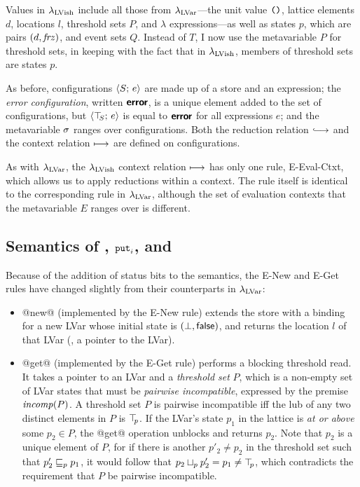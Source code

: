 Values in $\lambda_{\textrm{LVish}}$ include all those from $\lambda_{\textrm{LVar}}$---the
unit value $\mbox{\texttt{()}}$, lattice elements $d$, locations $l$, threshold
sets $P$, and $\lambda$ expressions---as well as states $p$, which are
pairs $(d, \mathit{frz})$, and event sets $Q$.  Instead of $T$, I now
use the metavariable $P$ for threshold sets, in keeping with the fact
that in $\lambda_{\textrm{LVish}}$, members of threshold sets are states $p$.

As before, configurations $\langle S;\, e \rangle$ are made up of a store and
an expression; the \emph{error configuration}, written $\textbf{\textsf{error}}$, is a
unique element added to the set of configurations, but
$\langle \top\hspace{-0.85mm}_{S};\, e \rangle$ is equal to $\textbf{\textsf{error}}$ for all expressions $e$; and
the metavariable $\sigma$ ranges over configurations.  Both the
reduction relation $\parstepsto$ and the context relation
$\longmapsto$ are defined on configurations.

As with $\lambda_{\textrm{LVar}}$, the $\lambda_{\textrm{LVish}}$ context relation
$\longmapsto$ has only one rule, {\sc E-Eval-Ctxt}, which allows us to
apply reductions within a context. The rule itself is identical to the
corresponding rule in $\lambda_{\textrm{LVar}}$, although the set of evaluation
contexts that the metavariable $E$ ranges over is different.

\subsection{Semantics of , $\mbox{\texttt{put}}_i$, and }\label{subsection:quasi-semantics-of-new-put-and-get}

Because of the addition of status bits to the semantics, the {\sc
  E-New} and {\sc E-Get} rules have changed slightly from their
counterparts in $\lambda_{\textrm{LVar}}$:

\begin{itemize}
\item @new@ (implemented by the {\sc E-New} rule) extends the store
  with a binding for a new LVar whose initial state is $(\bot,
  \textsf{false})$, and returns the location $l$ of that LVar (\ie, a
  pointer to the LVar).
\item @get@ (implemented by the {\sc E-Get} rule) performs a blocking
  threshold read.  It takes a pointer to an LVar and a \emph{threshold
    set} $P$, which is a non-empty set of LVar states that must be
  \emph{pairwise incompatible}, expressed by the premise $\mathit{incomp}(P)$.
  A threshold set $P$ is pairwise incompatible iff the lub of any two
  distinct elements in $P$ is $\top\hspace{-0.85mm}_{p}$.  If the LVar's state $p_1$ in
  the lattice is \emph{at or above} some $p_2 \in P$, the @get@
  operation unblocks and returns $p_2$.  Note that $p_2$ is a unique
  element of $P$, for if there is another $p'_2 \neq p_2$ in the
  threshold set such that $p'_2 \sqsubseteq_p p_1$, it would follow that
  $p_2 \sqcup_p p'_2 = p_1 \neq \top\hspace{-0.85mm}_{p}$, which contradicts the
  requirement that $P$ be pairwise incompatible.
\end{itemize}

